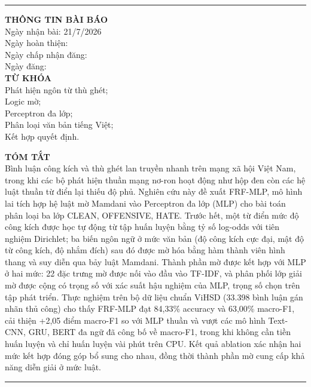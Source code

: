 \documentclass[11pt,a4paper]{article}
\begin{document}
\vspace{4pt}
\noindent\rule{\textwidth}{0.6pt}
\noindent
\begin{minipage}[t]{0.28\textwidth}
\vspace{2pt}
{\fontsize{10}{12}\selectfont
\textbf{THÔNG TIN BÀI BÁO}\\[3pt]
Ngày nhận bài: 21/7/2026\\
Ngày hoàn thiện:\\
Ngày chấp nhận đăng:\\
Ngày đăng:\\[6pt]
\textbf{TỪ KHÓA}\\[3pt]
Phát hiện ngôn từ thù ghét;\\
Logic mờ;\\
Perceptron đa lớp;\\
Phân loại văn bản tiếng Việt;\\
Kết hợp quyết định.
}
\end{minipage}\hfill
\begin{minipage}[t]{0.68\textwidth}
\vspace{2pt}
{\fontsize{10}{12}\selectfont
\textbf{TÓM TẮT}\\[3pt]
Bình luận công kích và thù ghét lan truyền nhanh trên mạng xã hội Việt Nam, trong khi các bộ phát hiện thuần mạng nơ-ron hoạt động như hộp đen còn các hệ luật thuần từ điển lại thiếu độ phủ. Nghiên cứu này đề xuất FRF-MLP, mô hình lai tích hợp hệ luật mờ Mamdani vào Perceptron đa lớp (MLP) cho bài toán phân loại ba lớp CLEAN, OFFENSIVE, HATE. Trước hết, một từ điển mức độ công kích được học tự động từ tập huấn luyện bằng tỷ số log-odds với tiên nghiệm Dirichlet; ba biến ngôn ngữ ở mức văn bản (độ công kích cực đại, mật độ từ công kích, độ nhắm đích) sau đó được mờ hóa bằng hàm thành viên hình thang và suy diễn qua bảy luật Mamdani. Thành phần mờ được kết hợp với MLP ở hai mức: 22 đặc trưng mờ được nối vào đầu vào TF-IDF, và phân phối lớp giải mờ được cộng có trọng số với xác suất hậu nghiệm của MLP, trọng số chọn trên tập phát triển. Thực nghiệm trên bộ dữ liệu chuẩn ViHSD (33.398 bình luận gán nhãn thủ công) cho thấy FRF-MLP đạt 84,33\% accuracy và 63,00\% macro-F1, cải thiện +2,05 điểm macro-F1 so với MLP thuần và vượt các mô hình Text-CNN, GRU, BERT đa ngữ đã công bố về macro-F1, trong khi không cần tiền huấn luyện và chỉ huấn luyện vài phút trên CPU. Kết quả ablation xác nhận hai mức kết hợp đóng góp bổ sung cho nhau, đồng thời thành phần mờ cung cấp khả năng diễn giải ở mức luật.
}
\end{minipage}
\vspace{2pt}
\noindent\rule{\textwidth}{0.6pt}
\end{document}
